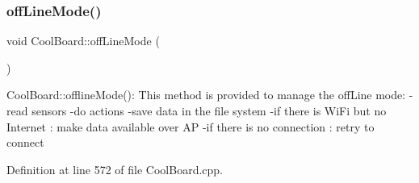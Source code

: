 \subsubsection{\texorpdfstring{off\+Line\+Mode()}{offLineMode()}}
{\footnotesize\ttfamily void Cool\+Board\+::off\+Line\+Mode (\begin{DoxyParamCaption}{ }\end{DoxyParamCaption})}

Cool\+Board\+::offline\+Mode()\+: This method is provided to manage the off\+Line mode\+: -\/read sensors -\/do actions -\/save data in the file system -\/if there is Wi\+Fi but no Internet \+: make data available over AP -\/if there is no connection \+: retry to connect 

Definition at line 572 of file Cool\+Board.\+cpp.


